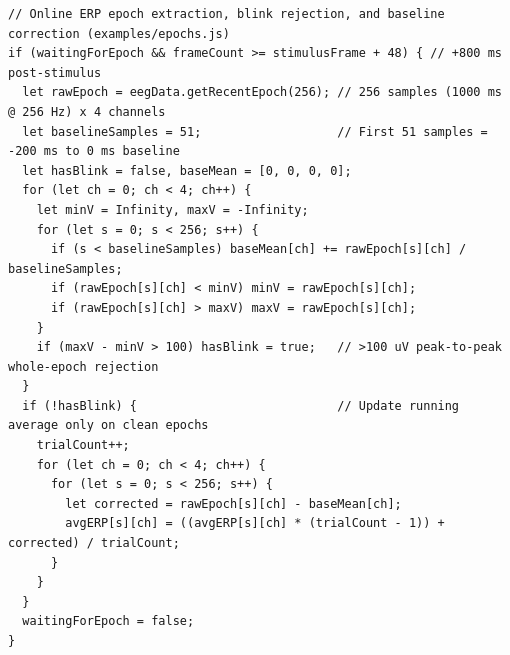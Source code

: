 \documentclass[11pt]{article}
\begin{document}
\noindent\begin{minipage}{\textwidth}
\begin{lstlisting}
// Online ERP epoch extraction, blink rejection, and baseline correction (examples/epochs.js)
if (waitingForEpoch && frameCount >= stimulusFrame + 48) { // +800 ms post-stimulus
  let rawEpoch = eegData.getRecentEpoch(256); // 256 samples (1000 ms @ 256 Hz) x 4 channels
  let baselineSamples = 51;                   // First 51 samples = -200 ms to 0 ms baseline
  let hasBlink = false, baseMean = [0, 0, 0, 0];
  for (let ch = 0; ch < 4; ch++) {
    let minV = Infinity, maxV = -Infinity;
    for (let s = 0; s < 256; s++) {
      if (s < baselineSamples) baseMean[ch] += rawEpoch[s][ch] / baselineSamples;
      if (rawEpoch[s][ch] < minV) minV = rawEpoch[s][ch];
      if (rawEpoch[s][ch] > maxV) maxV = rawEpoch[s][ch];
    }
    if (maxV - minV > 100) hasBlink = true;   // >100 uV peak-to-peak whole-epoch rejection
  }
  if (!hasBlink) {                            // Update running average only on clean epochs
    trialCount++;
    for (let ch = 0; ch < 4; ch++) {
      for (let s = 0; s < 256; s++) {
        let corrected = rawEpoch[s][ch] - baseMean[ch];
        avgERP[s][ch] = ((avgERP[s][ch] * (trialCount - 1)) + corrected) / trialCount;
      }
    }
  }
  waitingForEpoch = false;
}
\end{lstlisting}
\end{minipage}
\vspace{4pt}
\end{document}
